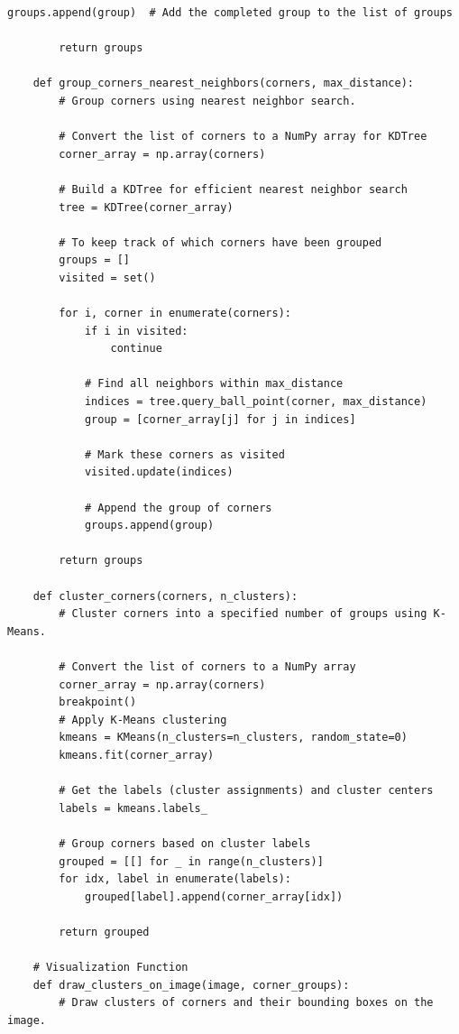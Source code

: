 \documentclass[11pt, conference, letterpaper]{IEEEtran}
\begin{document}
\begin{lstlisting}[style=python, caption={\texttt{plot\_utils.py}}, label={lst:putils}]
            groups.append(group)  # Add the completed group to the list of groups
        
        return groups
    
    def group_corners_nearest_neighbors(corners, max_distance):
        # Group corners using nearest neighbor search.
    
        # Convert the list of corners to a NumPy array for KDTree
        corner_array = np.array(corners)
    
        # Build a KDTree for efficient nearest neighbor search
        tree = KDTree(corner_array)
        
        # To keep track of which corners have been grouped
        groups = []
        visited = set()
        
        for i, corner in enumerate(corners):
            if i in visited:
                continue
            
            # Find all neighbors within max_distance
            indices = tree.query_ball_point(corner, max_distance)
            group = [corner_array[j] for j in indices]
            
            # Mark these corners as visited
            visited.update(indices)
            
            # Append the group of corners
            groups.append(group)
            
        return groups
    
    def cluster_corners(corners, n_clusters):
        # Cluster corners into a specified number of groups using K-Means.
    
        # Convert the list of corners to a NumPy array
        corner_array = np.array(corners)
        breakpoint()
        # Apply K-Means clustering
        kmeans = KMeans(n_clusters=n_clusters, random_state=0)
        kmeans.fit(corner_array)
    
        # Get the labels (cluster assignments) and cluster centers
        labels = kmeans.labels_
    
        # Group corners based on cluster labels
        grouped = [[] for _ in range(n_clusters)]
        for idx, label in enumerate(labels):
            grouped[label].append(corner_array[idx])
    
        return grouped
    
    # Visualization Function
    def draw_clusters_on_image(image, corner_groups):
        # Draw clusters of corners and their bounding boxes on the image.
        

\end{lstlisting}
\end{document}
